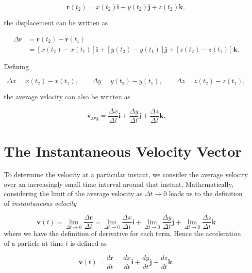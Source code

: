 \documentclass[../main.tex]{subfiles}
\theoremstyle{remark}
\begin{document}
\begin{equation}
\mathbf{r}(t_2)
=
x(t_2)\mathbf{i}
+
y(t_2)\mathbf{j}
+
z(t_2)\mathbf{k},
\end{equation}

the displacement can be written as

\begin{equation}
\begin{aligned}
\Delta\mathbf{r}
&=
\mathbf{r}(t_2)-\mathbf{r}(t_1) \\
&=
\left[x(t_2)-x(t_1)\right]\mathbf{i}
+
\left[y(t_2)-y(t_1)\right]\mathbf{j}
+
\left[z(t_2)-z(t_1)\right]\mathbf{k}.
\end{aligned}
\end{equation}

Defining

\begin{equation}
\Delta x = x(t_2)-x(t_1), \qquad
\Delta y = y(t_2)-y(t_1), \qquad
\Delta z = z(t_2)-z(t_1),
\end{equation}

the average velocity can also be written as

\begin{equation}
\mathbf{v}_{\mathrm{avg}}
=
\frac{\Delta x}{\Delta t}\mathbf{i}
+
\frac{\Delta y}{\Delta t}\mathbf{j}
+
\frac{\Delta z}{\Delta t}\mathbf{k}.
\end{equation}

\section{The Instantaneous Velocity Vector}

To determine the velocity at a particular instant, we consider the average velocity over an increasingly small time interval around that instant. Mathematically, considering the limit of the average velocity as $\Delta t \rightarrow 0$ leads us to the definition of \emph{instantaneous velocity}

\begin{equation}
\mathbf{v}(t) =
\lim_{\Delta t\rightarrow 0}
\frac{\Delta\mathbf{r}}{\Delta t} =
\lim_{\Delta t\rightarrow 0}\frac{\Delta x}{\Delta t}\mathbf{i}
+
\lim_{\Delta t\rightarrow 0}\frac{\Delta y}{\Delta t}\mathbf{j}
+
\lim_{\Delta t\rightarrow 0}\frac{\Delta z}{\Delta t}\mathbf{k}
\end{equation}
where we have the definition of derivative for each term. Hence the acceleration of a particle at time $t$ is defined as


\begin{equation}
\mathbf{v}(t) = \frac{d\mathbf{r}}{dt} =
\frac{dx}{dt}\mathbf{i}
+
\frac{dy}{dt}\mathbf{j}
+
\frac{dz}{dt}\mathbf{k}.
\end{equation}
\end{document}
